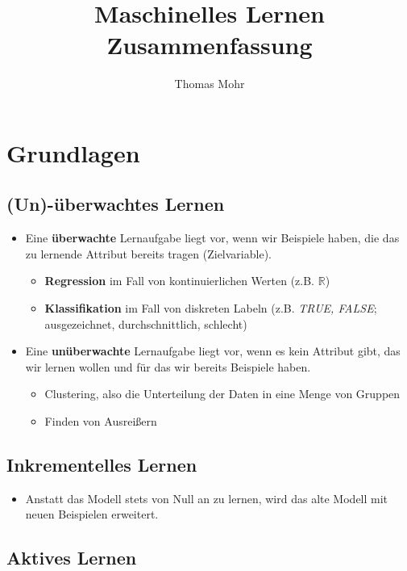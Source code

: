 \documentclass{scrartcl}
\title{Maschinelles Lernen \\ Zusammenfassung}
\author{Thomas Mohr}
\date{}
\begin{document}
\maketitle
\pagebreak
\tableofcontents
\pagebreak

\section{Grundlagen}

\subsection{(Un)-überwachtes Lernen}

\begin{itemize}
	\item Eine \textbf{überwachte} Lernaufgabe liegt vor, wenn wir Beispiele 
	haben, die das zu lernende Attribut bereits tragen (Zielvariable).
	\begin{itemize}
		\item \textbf{Regression} im Fall von kontinuierlichen Werten (z.B. $ 
		\mathbb{R} $)
		\item \textbf{Klassifikation} im Fall von diskreten Labeln (z.B. 
		\textit{TRUE, FALSE}; ausgezeichnet, durchschnittlich, schlecht)
	\end{itemize}
	\item Eine \textbf{unüberwachte} Lernaufgabe liegt vor, wenn es kein 
	Attribut gibt, das wir lernen wollen und für das wir bereits Beispiele 
	haben.
	\begin{itemize}
		\item Clustering, also die Unterteilung der Daten in eine Menge 
		von Gruppen
		\item Finden von Ausreißern
	\end{itemize}
\end{itemize}

\subsection{Inkrementelles Lernen}

\begin{itemize}
	\item Anstatt das Modell stets von Null an zu lernen, wird das alte Modell 
	mit neuen Beispielen erweitert.
\end{itemize}

\subsection{Aktives Lernen}
\end{document}
